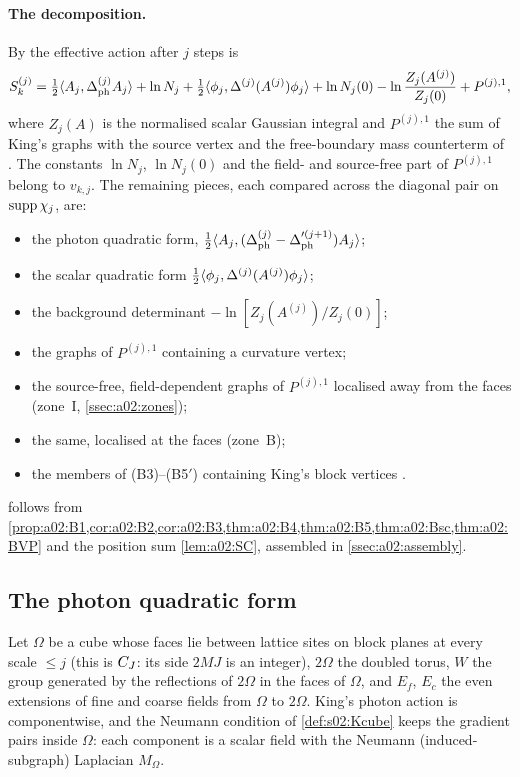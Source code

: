\paragraph{The decomposition.} By \cite[(3.90)]{K1} the effective action after $j$ steps is
\begin{equation}\label{eq:a02:390}
S^{(j)}_k=\tfrac12\langle A_j,\Delta^{(j)}_{\mathrm{ph}}A_j\rangle+\ln N_j+\tfrac12\langle \phi_j,\Delta^{(j)}(A^{(j)})\phi_j\rangle+\ln N_j(0)-\ln\frac{Z_j(A^{(j)})}{Z_j(0)}+P^{(j),1},
\end{equation}
where $Z_j(A)$ is the normalised scalar Gaussian integral \cite[(2.15)]{K1} and $P^{(j),1}$ the sum of King's graphs \cite[Sect.~3.3]{K1} with the source vertex \cite[(3.20)]{K1} and the free-boundary mass counterterm of \cite[p.~330]{K2}. The constants $\ln N_j$, $\ln N_j(0)$ and the field- and source-free part of $P^{(j),1}$ belong to $v_{k,j}$. The remaining pieces, each compared across the diagonal pair on $\operatorname{supp}\chi_j$, are:
\begin{itemize}[nosep]
\item[(B1)] the photon quadratic form, $\frac12\langle A_j,(\Delta^{(j)}_{\mathrm{ph}}-\Delta'^{(j+1)}_{\mathrm{ph}})A_j\rangle$;
\item[(B2)] the scalar quadratic form $\frac12\langle \phi_j,\Delta^{(j)}(A^{(j)})\phi_j\rangle$;
\item[(B3)] the background determinant $-\ln[Z_j(A^{(j)})/Z_j(0)]$;
\item[(B4)] the graphs of $P^{(j),1}$ containing a curvature vertex;
\item[(B5)] the source-free, field-dependent graphs of $P^{(j),1}$ localised away from the faces (zone~I, \cref{ssec:a02:zones});
\item[(B5$'$)] the same, localised at the faces (zone~B);
\item[(B6)] the members of (B3)--(B5$'$) containing King's block vertices \cite[(3.25)--(3.26)]{K1}.
\end{itemize}
 follows from \cref{prop:a02:B1,cor:a02:B2,cor:a02:B3,thm:a02:B4,thm:a02:B5,thm:a02:Bsc,thm:a02:BVP} and the position sum \cref{lem:a02:SC}, assembled in \cref{ssec:a02:assembly}.

\subsection{The photon quadratic form}\label{ssec:a02:B1}

Let $\Omega$ be a cube whose faces lie between lattice sites on block planes at every scale $\le j$ (this is $C_J$: its side $2MJ$ is an integer), $2\Omega$ the doubled torus, $W$ the group generated by the reflections of $2\Omega$ in the faces of $\Omega$, and $E_f$, $E_c$ the even extensions of fine and coarse fields from $\Omega$ to $2\Omega$. King's photon action \cite[(2.5)]{K2} is componentwise, and the Neumann condition of \cref{def:s02:Kcube} keeps the gradient pairs inside $\Omega$: each component is a scalar field with the Neumann (induced-subgraph) Laplacian $M_\Omega$.

